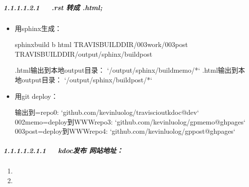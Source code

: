\documentclass[letterpaper,12pt,english]{sphinxmanual}
\begin{document}
\subparagraph{1.1.1.1.2.1   .rst 转成 .html;}
\label{\detokenize{001software/001install/001._u7f51_u7ad9/gitpage:rst-html}}\begin{itemize}
\item {} 
用sphinx生成：

\begin{sphinxVerbatim}[commandchars=\\\{\}]
sphinx\PYGZhy{}build \PYGZhy{}b html \PYGZdl{}TRAVIS\PYGZus{}BUILD\PYGZus{}DIR/003work/003post \PYGZdl{}TRAVIS\PYGZus{}BUILD\PYGZus{}DIR/output/sphinx/build\PYGZhy{}post
\end{sphinxVerbatim}

\begin{sphinxVerbatim}[commandchars=\\\{\}]
.html输出到本地output目录： {}`/output/sphinx/build\PYGZhy{}memo/*{}`
.html输出到本地output目录： {}`/output/sphinx/build\PYGZhy{}post/*{}`
\end{sphinxVerbatim}

\item {} 
用git deploy：

\begin{sphinxVerbatim}[commandchars=\\\{\}]
  
    
 
\end{sphinxVerbatim}

\begin{sphinxVerbatim}[commandchars=\\\{\}]
输出到=\PYGZgt{}repo0: {}`github.com/kevinluolog/travisci\PYGZus{}out\PYGZus{}kdoc@dev{}`
002memo=\PYGZgt{}deploy到WWWrepo3: {}`github.com/kevinluolog/gp\PYGZhy{}memo@gh\PYGZhy{}pages{}`
003post=\PYGZgt{}deploy到WWWrepo4: {}`github.com/kevinluolog/gp\PYGZhy{}post@gh\PYGZhy{}pages{}`
\end{sphinxVerbatim}

\end{itemize}


\subparagraph{1.1.1.1.2.1.1   kdoc发布 网站地址：}
\label{\detokenize{001software/001install/001._u7f51_u7ad9/gitpage:kdoc}}\begin{enumerate}
%
\item {} 

\item {} 

\end{enumerate}
\end{document}
